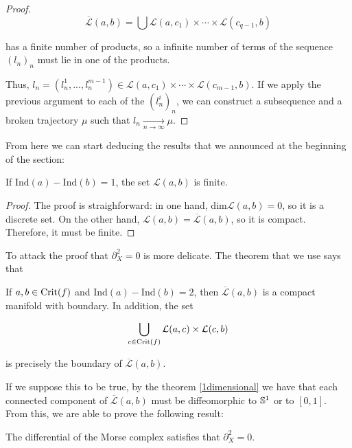\begin{proof}
$$\overline{\mathcal{L}}(a,b) = \bigcup \mathcal{L}(a,c_1) \times \cdots \times \mathcal{L}(c_{q-1},b)$$

has a finite number of products, so a infinite number of terms of the sequence $(l_n)_n$ must lie in one of the products.

Thus, $l_n = (l_n^1,...,l_n^{m-1}) \in \mathcal{L}(a,c_1) \times \cdots \times \mathcal{L}(c_{m-1},b)$. If we apply the previous argument to each of the $(l_n^i)_n$, we can construct a subsequence and a broken trajectory $\mu$ such that $l_n \xrightarrow[n \rightarrow \infty]{} \mu$.
\end{proof}

From here we can start deducing the results that we announced at the beginning of the section:

\begin{coro}
If $\text{Ind}(a)-\text{Ind}(b) = 1$, the set $\mathcal{L}(a,b)$ is finite.
\end{coro}

\begin{proof}
The proof is straighforward: in one hand, $\text{dim} \mathcal{L}(a,b) = 0$, so it is a discrete set. On the other hand, $\mathcal{L}(a,b) = \overline{\mathcal{L}}(a,b)$, so it is compact. Therefore, it must be finite.
\end{proof}

To attack the proof that $\partial_X^2 = 0$ is more delicate.
The theorem that we use says that

\begin{theo}
If $a, b \in \text{Crit}(f)$ and $\text{Ind}(a)-\text{Ind}(b) = 2$, then $\overline{\mathcal{L}}(a,b)$ is a compact manifold with boundary. In addition, the set

$$\bigcup_{c \in \text{Crit}(f)} \mathcal{L}(a,c) \times \mathcal{L}(c,b)$$

is precisely the boundary of $\overline{\mathcal{L}}(a,b)$.
\end{theo}

If we suppose this to be true, by the theorem \ref{1dimensional} we have that each connected component of $\overline{\mathcal{L}}(a,b)$ must be diffeomorphic to $\mathbb{S}^1$ or to $[0,1]$. From this, we are able to prove the following result:

\begin{coro} The differential of the Morse complex satisfies that $\partial_X^2 = 0$.
\end{coro}


